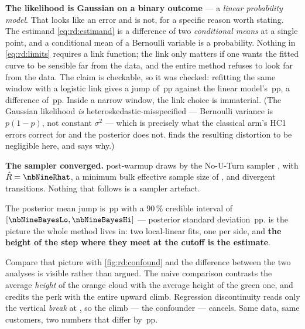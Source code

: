 \textbf{The likelihood is Gaussian on a binary outcome} --- a \emph{linear probability model}. That
looks like an error and is not, for a specific reason worth stating. The estimand
\cref{eq:rd:estimand} is a difference of two \emph{conditional means} at a single point, and a
conditional mean of a Bernoulli variable is a probability. Nothing in \cref{eq:rd:limits} requires a
link function; the link only matters if one wants the fitted curve to be sensible far from the data,
and the entire method refuses to look far from the data. The claim is checkable, so it was checked:
refitting the same window with a logistic link gives a jump of \nbNineLogitJump{}\,pp against the
linear model's \nbNineBayes{}\,pp, a difference of \nbNineLogitDiff{}\,pp. Inside a narrow window,
the link choice is immaterial. (The Gaussian likelihood \emph{is} heteroskedastic-misspecified ---
Bernoulli variance is $p(1-p)$, not constant $\sigma^2$ --- which is precisely what the classical
arm's HC1 errors correct for and the posterior does not.  finds the resulting
distortion to be negligible here, and says why.)

\textbf{The sampler converged.} \nbNineNDraws{} post-warmup draws by the No-U-Turn sampler
\citep{hoffman2014}, with $\hat R = \nbNineRhat$, a minimum bulk effective sample size of
\nbNineEss{} \citep{vehtari2021}, and \nbNineDivergences{} divergent transitions. Nothing that
follows is a sampler artefact.

The posterior mean jump is \nbNineBayes{}\,pp with a 90\,\% credible interval of
$[\nbNineBayesLo, \nbNineBayesHi]$ --- posterior standard deviation \nbNineBayesSd{}\,pp.
 is the picture the whole method lives in: two local-linear fits, one per side,
and \textbf{the height of the step where they meet at the cutoff is the estimate}.



Compare that picture with \cref{fig:rd:confound} and the difference between the two analyses is
visible rather than argued. The naive comparison contrasts the average \emph{height} of the orange
cloud with the average height of the green one, and credits the perk with the entire upward climb.
Regression discontinuity reads only the vertical \emph{break} at \eur{\nbNineCutoff}, so the climb
--- the confounder --- cancels. Same data, same customers, two numbers that differ by
\nbNineNaiveBias{}\,pp.

